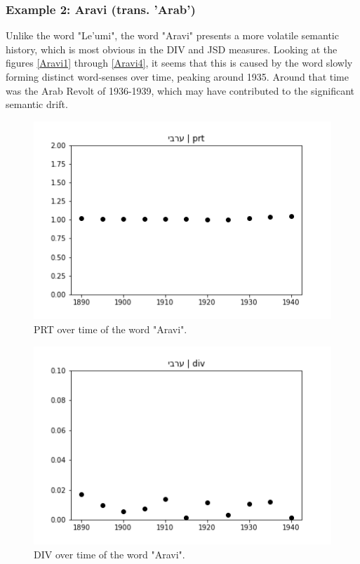 \documentclass[10pt, a4paper]{article}
\begin{document}
\subsubsection{Example 2: Aravi (trans. 'Arab')}
Unlike the word "Le'umi", the word "Aravi" presents a more volatile semantic history, which is most obvious in the DIV and JSD measures. Looking at the figures \ref{Aravi1} through \ref{Aravi4}, it seems that this is caused by the word slowly forming distinct word-senses over time, peaking around 1935. Around that time was the Arab Revolt of 1936-1939, which may have contributed to the significant semantic drift.
\begin{figure}[!h]
\begin{center}
\includegraphics[scale=0.5]{LREC_PAPER/aravi/ערבי_prt.png}
\caption{PRT over time of the word "Aravi".}
\label{fig.5}
\end{center}
\end{figure}

\begin{figure}[!h]
\begin{center}
\includegraphics[scale=0.5]{LREC_PAPER/aravi/ערבי_div.png}
\caption{DIV over time of the word "Aravi".}
\label{fig.6}
\end{center}
\end{figure}
\end{document}
